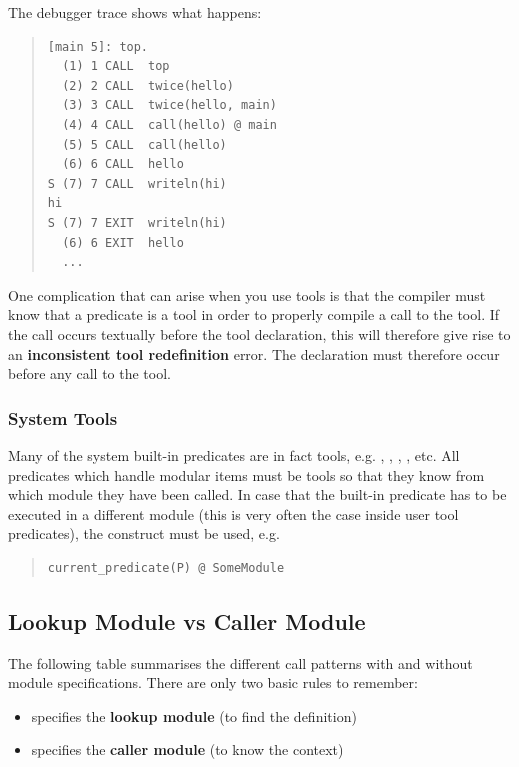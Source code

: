 The debugger trace shows what happens:
\begin{quote} \begin{verbatim}
[main 5]: top.
  (1) 1 CALL  top
  (2) 2 CALL  twice(hello)
  (3) 3 CALL  twice(hello, main)
  (4) 4 CALL  call(hello) @ main
  (5) 5 CALL  call(hello)
  (6) 6 CALL  hello
S (7) 7 CALL  writeln(hi)
hi
S (7) 7 EXIT  writeln(hi)
  (6) 6 EXIT  hello
  ...
\end{verbatim} \end{quote}

One complication that can arise when you use tools is that the compiler
must know that a predicate is a tool in order to properly compile
a call to the tool.
If the call occurs textually before the tool
declaration,  this will therefore give rise to an
{\bf inconsistent tool redefinition} error.
The
declaration must therefore occur before any call to the tool.


\subsubsection{System Tools}
Many of the system built-in predicates are in fact tools, e.g.
,
,
,
, etc.
All predicates which handle modular items must be tools
so that they know from which module they have been called.
In case that the built-in predicate has to be executed in
a different module (this is very often the case inside
user tool predicates), the 
construct must be used, e.g.
\begin{quote}\begin{verbatim}
current_predicate(P) @ SomeModule
\end{verbatim}\end{quote}


\subsection{Lookup Module vs Caller Module}

The following table summarises the different call patterns with and
without module specifications.
There are only two basic rules to remember:
\begin{itemize}
\item {}
	specifies the {\bf lookup module} (to find the definition)
\item {}
{} 
	specifies the {\bf caller module} (to know the context)
\end{itemize}

